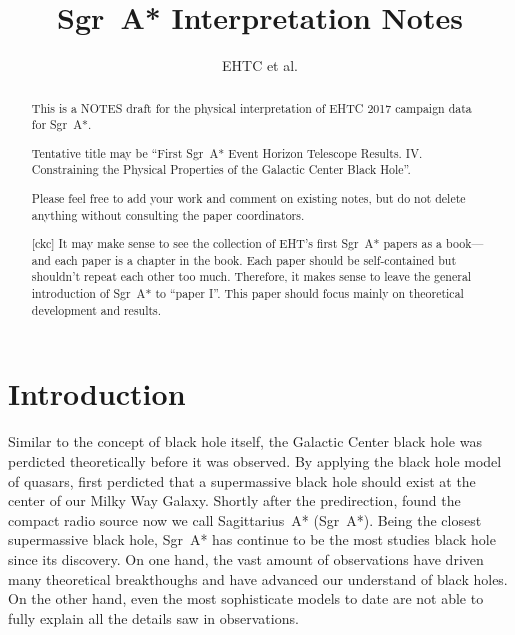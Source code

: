 \documentclass[twocolumn,tighten,dvipsnames]{aastex63}
\newcommand\sgra{Sgr~A*\xspace}
\newcommand\<{{\langle}}
\renewcommand\>{{\rangle}} %
\newcommand\ckc[1]{{\color{MidnightBlue}[ckc] #1}}
\begin{document}
\title{\sgra Interpretation Notes}
\author{EHTC et al.}

\shorttitle{\sgra Interpretation}

\revised{\today}

\begin{abstract}
  \color{BrickRed}

  This is a NOTES draft for the physical interpretation of EHTC 2017
  campaign data for \sgra.

  Tentative title may be ``First \sgra Event Horizon Telescope
  Results. IV. Constraining the Physical Properties of the Galactic
  Center Black Hole''.

  Please feel free to add your work and comment on existing notes, but
  do not delete anything without consulting the paper coordinators.

  \ckc{It may make sense to see the collection of EHT's first \sgra
    papers as a book---and each paper is a chapter in the book.
    Each paper should be self-contained but shouldn't repeat each
    other too much.
    Therefore, it makes sense to leave the general introduction of
    \sgra to ``paper I''.
    This paper should focus mainly on theoretical development and
    results.}
\end{abstract}


\section{Introduction} \label{sec:intro}

Similar to the concept of black hole itself, the Galactic Center black
hole was perdicted theoretically before it was observed.
By applying the black hole model of quasars,
\citet{1971MNRAS.152..461L} first perdicted that a supermassive black
hole should exist at the center of our Milky Way Galaxy.
Shortly after the predirection, \citet{1974ApJ...194..265B,
  1975A&A....43..159E, 1975ApJ...202L..63L} found the compact radio
source now we call Sagittarius~A* (\sgra).
Being the closest supermassive black hole, \sgra has continue to be
the most studies black hole since its discovery.
On one hand, the vast amount of observations have driven many
theoretical breakthoughs and have advanced our understand of black
holes.
On the other hand, even the most sophisticate models to date are not
able to fully explain all the details saw in observations.
\end{document}
